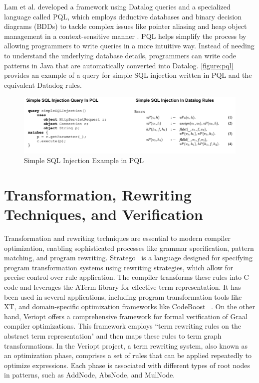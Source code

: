 Lam et al. developed a framework using Datalog queries and a specialized language called PQL, which employs deductive databases and binary decision diagrams (BDDs) to tackle complex issues like pointer aliasing and heap object management in a context-sensitive manner \cite{Lam2005}. PQL helps simplify the process by allowing programmers to write queries in a more intuitive way. Instead of needing to understand the underlying database details, programmers can write code patterns in Java that are automatically converted into Datalog. \autoref{figure:pql} provides an example of a query for simple SQL injection written in PQL and the equivalent Datadog rules. 

\begin{figure}[h]
    \centering
    \includegraphics[width=1\textwidth]{Packages/PQL.png}
    \caption{Simple SQL Injection Example in PQL \cite{Lam2005}}
    \label{figure:pql}
\end{figure}

\newpage
\section{Transformation, Rewriting Techniques, and Verification}
Transformation and rewriting techniques are essential to modern compiler optimization, enabling sophisticated processes like grammar specification, pattern matching, and program rewriting. Stratego~\cite{Eelco2001} is a language designed for specifying program transformation systems using rewriting strategies, which allow for precise control over rule application. The compiler transforms these rules into C code and leverages the ATerm library for effective term representation. It has been used in several applications, including program transformation tools like XT, and domain-specific optimization frameworks like CodeBoost ~\cite{Eelco2001}. On the other hand, Veriopt \cite{Webb2023} offers a comprehensive framework for formal verification of Graal compiler optimizations. This framework employs  ``term rewriting rules on the abstract term representation" \cite{Webb2023} and then maps these rules to term graph transformations. In the Veriopt project, a term rewriting system, also known as an optimization phase, comprises a set of rules that can be applied repeatedly to optimize expressions. Each phase is associated with different types of root nodes in patterns, such as AddNode, AbsNode, and MulNode. 

